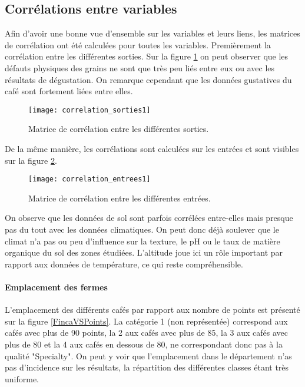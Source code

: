 \subsection{Corrélations entre variables}

Afin d'avoir une bonne vue d'ensemble sur les variables et leurs liens, les matrices de corrélation ont été calculées pour toutes les variables. Premièrement la corrélation entre les différentes sorties. Sur la figure \ref{correlation_sorties1} on peut observer que les défauts physiques des grains ne sont que très peu liés entre eux ou avec les résultats de dégustation. On remarque cependant que les données gustatives du café sont fortement liées entre elles. 

\begin{figure}[H]
	\texttt{[image: correlation\_sorties1]}
	\caption{\label{correlation_sorties1} Matrice de corrélation entre les différentes sorties.}
\end{figure}


De la même manière, les corrélations sont calculées sur les entrées et sont visibles sur la figure \ref{correlation_entrees1}. 


\begin{figure}[H]
	\texttt{[image: correlation\_entrees1]}
	\caption{\label{correlation_entrees1} Matrice de corrélation entre les différentes entrées.}
\end{figure}


On observe que les données de sol sont parfois corrélées entre-elles mais presque pas du tout avec les données climatiques. On peut donc déjà soulever que le climat n'a pas ou peu d'influence sur la texture, le pH ou le taux de matière organique du sol des zones étudiées. L'altitude joue ici un rôle important par rapport aux données de température, ce qui reste compréhensible. 



\paragraph{Emplacement des fermes} L'emplacement des différents cafés par rapport aux nombre de points est présenté sur la figure \ref{FincaVSPoints}. La catégorie 1 (non représentée) correspond aux cafés avec plus de 90 points, la 2 aux cafés avec plus de 85, la 3 aux cafés avec plus de 80 et la 4 aux cafés en dessous de 80, ne correspondant donc pas à la qualité "Specialty". On peut y voir que l'emplacement dans le département n'as pas d'incidence sur les résultats, la répartition des différentes classes étant très uniforme. 


